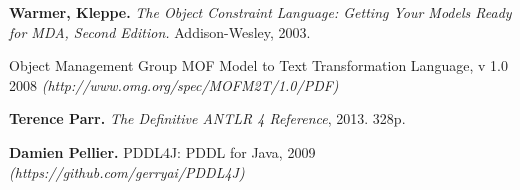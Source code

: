 \begin{thebibliography}{00}
\textbf{Warmer, Kleppe.} \textit{The Object Constraint Language: Getting Your Models Ready for MDA, Second Edition.} Addison-Wesley, 2003.

Object Management Group MOF Model to Text Transformation Language, v 1.0 2008 \textit{(http://www.omg.org/spec/MOFM2T/1.0/PDF)}

\textbf{Terence Parr.} \textit{ The Definitive ANTLR 4 Reference}, 2013. 328p.

\textbf{Damien Pellier.} PDDL4J: PDDL for Java, 2009 \textit{(https://github.com/gerryai/PDDL4J)}


\end{thebibliography}

\newpage